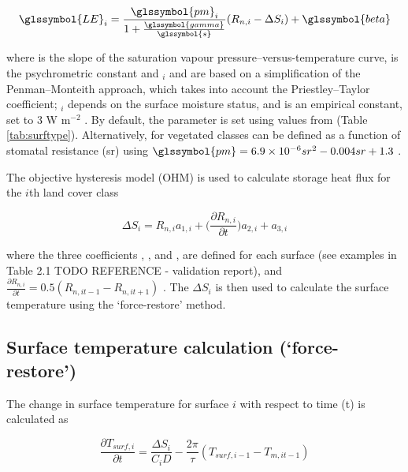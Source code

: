 \documentclass[final,3p,times,authoryear]{elsarticle}
\begin{document}
\begin{equation} 
\glssymbol{LE}_{i} = 
\frac{\glssymbol{pm}_{i}}{1+\frac{\glssymbol{gamma}}{\glssymbol{s}}}
(R_{n,i}-\Delta S_{i})+ \glssymbol{beta}
\label{eq:LE} \end{equation} 

where  is the slope of the saturation vapour pressure–versus-temperature curve,  is the psychrometric constant and $_{i}$ and  are based on a simplification of the Penman–Monteith approach, which takes into account the Priestley–Taylor coefficient; $_{i}$ depends on the surface moisture status, and  is an empirical constant, set to 3 W m$^{-2}$ \citep{Grimmond2002a}. By default, the  parameter is set using values from \cite{Hanna1992} (Table \ref{tab:surftype}). Alternatively,  for vegetated classes can be defined as a function of stomatal resistance (sr) using $\glssymbol{pm} = 6.9\times10^{-6} sr^{2} - 0.004 sr + 1.3$ \citep{DeBruin1983}.  

The objective hysteresis model (OHM) is used to calculate storage heat flux for the $i$th land cover class  \citep{Grimmond2002a} 

\begin{equation} 
\Delta S_{i} = R_{n,i} a_{1,i} + \Big( \frac{\partial R_{n,i}}{\partial t}   \Big)a_{2,i} + a_{3,i}
\label{eq:ohm} \end{equation} 


where the three coefficients , , and , are defined for each surface (see examples in Table 2.1 TODO REFERENCE - validation report), and $\frac{\partial R_{n,i}}{\partial t} =0.5(R_{n,it-1} - R_{n,it+1})$  .  The $\Delta S_{i}$ is then used to calculate the surface temperature using the `force-restore' method.


\subsection{Surface temperature calculation (`force-restore')}\label{sec:tsurf}

The change in surface temperature  for surface $i$ with respect to time (t) is calculated as

\begin{equation} 
\frac{\partial T_{surf,i}}{\partial t}= \frac{\Delta S_{i}}{C_{i} D} - \frac{2 \pi}{\tau} (T_{surf,i -1} - T_{m,it-1})
\label{eq:force} \end{equation} 
\end{document}
